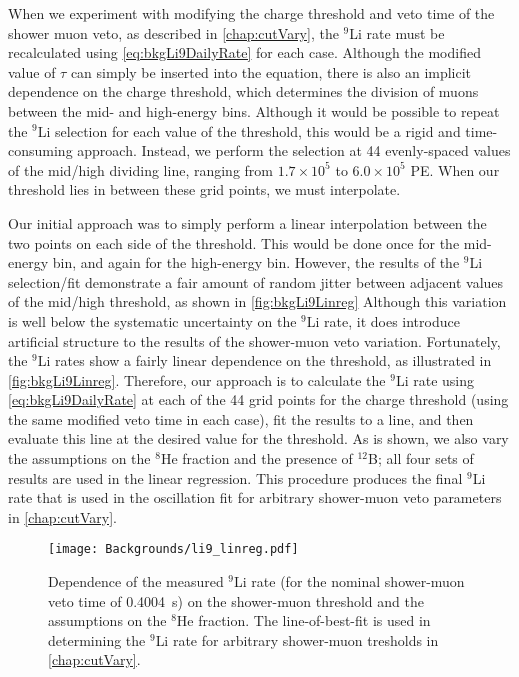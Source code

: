 \documentclass[../thesis.tex]{subfiles}
\begin{document}
When we experiment with modifying the charge threshold and veto time of the shower muon veto, as described in \autoref{chap:cutVary}, the $^9$Li rate must be recalculated using \autoref{eq:bkgLi9DailyRate} for each case. Although the modified value of $\tau$ can simply be inserted into the equation, there is also an implicit dependence on the charge threshold, which determines the division of muons between the mid- and high-energy bins. Although it would be possible to repeat the $^9$Li selection for each value of the threshold, this would be a rigid and time-consuming approach. Instead, we perform the selection at 44 evenly-spaced values of the mid/high dividing line, ranging from $1.7\times10^5$ to $6.0\times10^5$ PE\@. When our threshold lies in between these grid points, we must interpolate.

Our initial approach was to simply perform a linear interpolation between the two points on each side of the threshold. This would be done once for the mid-energy bin, and again for the high-energy bin. However, the results of the $^9$Li selection/fit demonstrate a fair amount of random jitter between adjacent values of the mid/high threshold, as shown in \autoref{fig:bkgLi9Linreg} Although this variation is well below the systematic uncertainty on the $^9$Li rate, it does introduce artificial structure to the results of the shower-muon veto variation. Fortunately, the $^9$Li rates show a fairly linear dependence on the threshold, as illustrated in \autoref{fig:bkgLi9Linreg}. Therefore, our approach is to calculate the $^9$Li rate using \autoref{eq:bkgLi9DailyRate} at each of the 44 grid points for the charge threshold (using the same modified veto time in each case), fit the results to a line, and then evaluate this line at the desired value for the threshold. As is shown, we also vary the assumptions on the $^8$He fraction and the presence of $^{12}$B; all four sets of results are used in the linear regression. This procedure produces the final $^9$Li rate that is used in the oscillation fit for arbitrary shower-muon veto parameters in \autoref{chap:cutVary}.

\begin{figure}[h]
  \texttt{[image: Backgrounds/li9\_linreg.pdf]}
  \caption{Dependence of the measured $^9$Li rate (for the nominal shower-muon veto time of 0.4004~s) on the shower-muon threshold and the assumptions on the $^8$He fraction. The line-of-best-fit is used in determining the $^9$Li rate for arbitrary shower-muon tresholds in \autoref{chap:cutVary}.}
  \label{fig:bkgLi9Linreg}
\end{figure}
\end{document}
